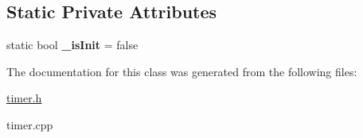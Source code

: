 \subsection*{Static Private Attributes}
\begin{DoxyCompactItemize}
\item 
\mbox{\label{classTimer_a0a01a2bb877f90195f529562b5f34d9f}} 
static bool {\bfseries \+\_\+is\+Init} = false
\end{DoxyCompactItemize}


The documentation for this class was generated from the following files\+:\begin{DoxyCompactItemize}
\item 
\hyperlink{timer_8h}{timer.\+h}\item 
timer.\+cpp\end{DoxyCompactItemize}
